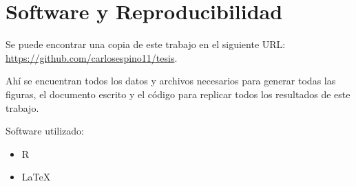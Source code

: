 \chapter{Software y Reproducibilidad}
Se puede encontrar una copia de este trabajo en el siguiente URL: \href{https://github.com/carlosespino11/tesis}{https://github.com/carlosespino11/tesis}. 

Ahí se encuentran todos los datos y archivos necesarios para generar todas las figuras, el documento escrito y el código para replicar todos los resultados de este trabajo.

Software utilizado:
\begin{itemize}
\item R
\item \LaTeX
\end{itemize}